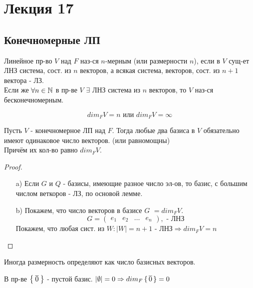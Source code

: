 \section{Лекция 17}
\subsection{Конечномерные ЛП}
\begin{definition}
Линейное пр-во $V$ над $F$ наз-ся $n$-мерным (или размерности $n$), если в $V$ сущ-ет ЛНЗ система, сост. из $n$ векторов, а всякая система, векторов, сост. из $n + 1$ вектора - ЛЗ. \\

Если же $\forall n \in \mathbb{N}$ в пр-ве $V$ $\exists$ ЛНЗ система из $n$ векторов, то $V$ наз-ся бесконечномерным.
\end{definition}
\begin{symb}
\[
dim_F V = n \text{ или } dim_F V = \infty
\]
\end{symb}
\begin{theorem}
Пусть $V$ - конечномерное ЛП над $F$. Тогда любые два базиса в $V$ обязательно имеют одинаковое число векторов. (или равномощны) \\
Причём их кол-во равно $dim_F V$.
\end{theorem}
\begin{proof}
\begin{itemize}
  \item [a) ] Если $G$ и $Q$ - базисы, имеющие разное число эл-ов, то базис, с большим числом веткоров - ЛЗ, по основой лемме.
  \item [b)]  Покажем, что число векторов в базисе $G$ $= dim_F V$.
    \[
      G = \begin{pmatrix} e_1 & e_2 & \ldots & e_n \end{pmatrix},  \text{ - ЛНЗ}
    \]
    Покажем, что любая сист. из $W \colon \left|W\right| = n + 1 \text{ - ЛНЗ} \Rightarrow dim_F V = n$
\end{itemize}
\end{proof}
\begin{note}
Иногда размерность определяют как число базисных векторов.
\end{note}
\begin{note}
В пр-ве $\Set{\overline{0}}$ - пустой базис. $\left|\emptyset\right| = 0 \Rightarrow dim_F \set{\overline{0}} = 0$
\end{note}
